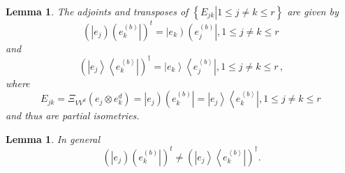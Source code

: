 \documentclass[aps,preprint]{revtex4}%
\newtheorem{lemma}[theorem]{Lemma}
\begin{document}
\begin{lemma}
The adjoints and transposes of $\left\{  \left.  E_{jk}\right\vert 1\leq j\neq
k\leq r\right\}  $ are given by
\begin{equation}
\left(  \left\vert e_{j}\right)  \left(  e_{k}^{\left(  b\right)  }\right\vert
\right)  ^{t}=\left\vert e_{k}\right)  \left(  e_{j}^{\left(  b\right)
}\right\vert ,1\leq j\neq k\leq r\,
\end{equation}
and
\begin{equation}
\left(  \left\vert e_{j}\right\rangle \left\langle e_{k}^{\left\langle
b\right\rangle }\right\vert \right)  ^{\dagger}=\left\vert e_{k}\right\rangle
\left\langle e_{j}^{\left\langle b\right\rangle }\right\vert ,1\leq j\neq
k\leq r\,,
\end{equation}
where
\begin{equation}
E_{jk}=\Xi_{VV^{d}}\left(  e_{j}\otimes e_{k}^{d}\right)  =\left\vert
e_{j}\right)  \left(  e_{k}^{\left(  b\right)  }\right\vert =\left\vert
e_{j}\right\rangle \left\langle e_{k}^{\left\langle b\right\rangle
}\right\vert ,1\leq j\neq k\leq r\,
\end{equation}
and thus are partial isometries.
\end{lemma}

\begin{lemma}
In general
\begin{equation}
\left(  \left\vert e_{j}\right)  \left(  e_{k}^{\left(  b\right)  }\right\vert
\right)  ^{t}\neq\left(  \left\vert e_{j}\right\rangle \left\langle
e_{k}^{\left\langle b\right\rangle }\right\vert \right)  ^{\dagger}.
\end{equation}

\end{lemma}
\end{document}
